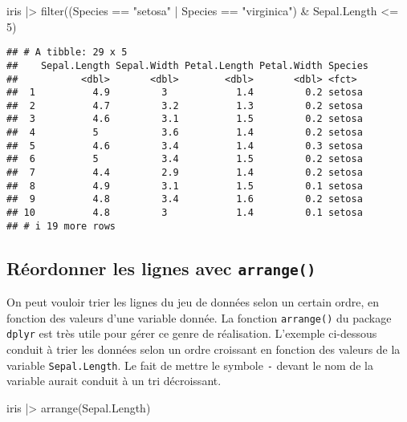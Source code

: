 \documentclass[
]{book}
\newenvironment{Shaded}{\begin{snugshade}}{\end{snugshade}}
\newcommand{\DecValTok}[1]{\textcolor[rgb]{0.00,0.00,0.81}{#1}}
\newcommand{\FunctionTok}[1]{\textcolor[rgb]{0.00,0.00,0.00}{#1}}
\newcommand{\NormalTok}[1]{#1}
\newcommand{\SpecialCharTok}[1]{\textcolor[rgb]{0.00,0.00,0.00}{#1}}
\newcommand{\StringTok}[1]{\textcolor[rgb]{0.31,0.60,0.02}{#1}}
\begin{document}
\begin{Shaded}
\begin{Highlighting}[]
\NormalTok{iris }\SpecialCharTok{|\textgreater{}}
  \FunctionTok{filter}\NormalTok{((Species }\SpecialCharTok{==} \StringTok{"setosa"} \SpecialCharTok{|}\NormalTok{ Species }\SpecialCharTok{==} \StringTok{"virginica"}\NormalTok{) }\SpecialCharTok{\&}
\NormalTok{           Sepal.Length }\SpecialCharTok{\textless{}=} \DecValTok{5}\NormalTok{)}
\end{Highlighting}
\end{Shaded}

\begin{verbatim}
## # A tibble: 29 x 5
##    Sepal.Length Sepal.Width Petal.Length Petal.Width Species
##           <dbl>       <dbl>        <dbl>       <dbl> <fct>  
##  1          4.9         3            1.4         0.2 setosa 
##  2          4.7         3.2          1.3         0.2 setosa 
##  3          4.6         3.1          1.5         0.2 setosa 
##  4          5           3.6          1.4         0.2 setosa 
##  5          4.6         3.4          1.4         0.3 setosa 
##  6          5           3.4          1.5         0.2 setosa 
##  7          4.4         2.9          1.4         0.2 setosa 
##  8          4.9         3.1          1.5         0.1 setosa 
##  9          4.8         3.4          1.6         0.2 setosa 
## 10          4.8         3            1.4         0.1 setosa 
## # i 19 more rows
\end{verbatim}

\hypertarget{ruxe9ordonner-les-lignes-avec-arrange}{%
\subsection{\texorpdfstring{Réordonner les lignes avec \texttt{arrange()}}{Réordonner les lignes avec arrange()}}\label{ruxe9ordonner-les-lignes-avec-arrange}}

On peut vouloir trier les lignes du jeu de données selon un certain ordre, en fonction des valeurs d'une variable donnée. La fonction \texttt{arrange()} du package \texttt{dplyr} est très utile pour gérer ce genre de réalisation. L'exemple ci-dessous conduit à trier les données selon un ordre croissant en fonction des valeurs de la variable \texttt{Sepal.Length}. Le fait de mettre le symbole \texttt{-} devant le nom de la variable aurait conduit à un tri décroissant.

\begin{Shaded}
\begin{Highlighting}[]
\NormalTok{iris }\SpecialCharTok{|\textgreater{}}
  \FunctionTok{arrange}\NormalTok{(Sepal.Length)}
\end{Highlighting}
\end{Shaded}
\end{document}
